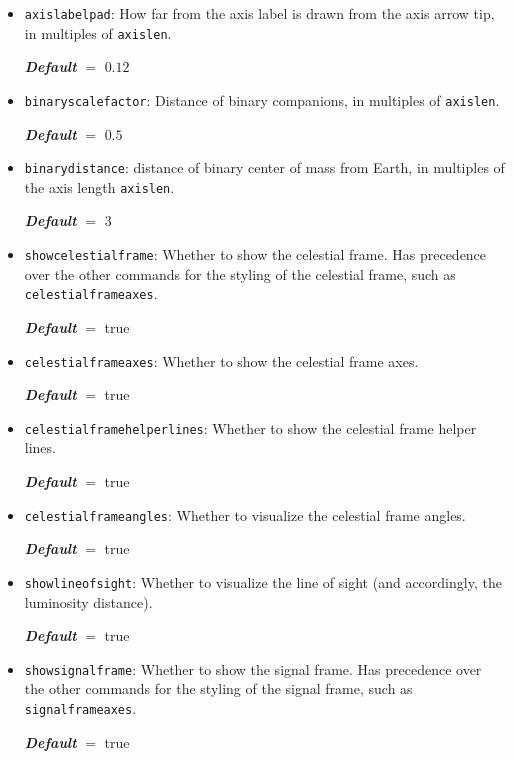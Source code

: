 \documentclass[
    DIV=11,
    BCOR=0mm,
    paper=a4,
    fontsize=11pt,
    twoside=false,
    titlepage=true
]{scrartcl}
\newcommand{\code}[1]{\textcolor{codecolor}{\texttt{#1}}}
\newcommand{\defaultval}[1]{%
    {\bfseries\slshape%
    Default} $=$ #1%
}
\begin{document}
\begin{itemize}
    \defaultval{$3$}


    \item \code{axislabelpad}: How far from the axis label is drawn from the axis arrow tip, in multiples of \code{axislen}.

    \defaultval{$0.12$}


    \item \code{binaryscalefactor}: Distance of binary companions, in multiples of \code{axislen}.

    \defaultval{$0.5$}


    \item \code{binarydistance}: distance of binary center of mass from Earth, in multiples of the axis length \code{axislen}.

    \defaultval{$3$}




    \item \code{showcelestialframe}: Whether to show the celestial frame. Has precedence over the other commands for the styling of the celestial frame, such as \code{celestialframeaxes}.

    \defaultval{true}


    \item \code{celestialframeaxes}: Whether to show the celestial frame axes.

    \defaultval{true}


    \item \code{celestialframehelperlines}: Whether to show the celestial frame helper lines.

    \defaultval{true}


    \item \code{celestialframeangles}: Whether to visualize the celestial frame angles.

    \defaultval{true}


    \item \code{showlineofsight}: Whether to visualize the line of sight (and accordingly, the luminosity distance).

    \defaultval{true}


    \item \code{showsignalframe}: Whether to show the signal frame. Has precedence over the other commands for the styling of the signal frame, such as \code{signalframeaxes}.

    \defaultval{true}



\end{itemize}
\end{document}
